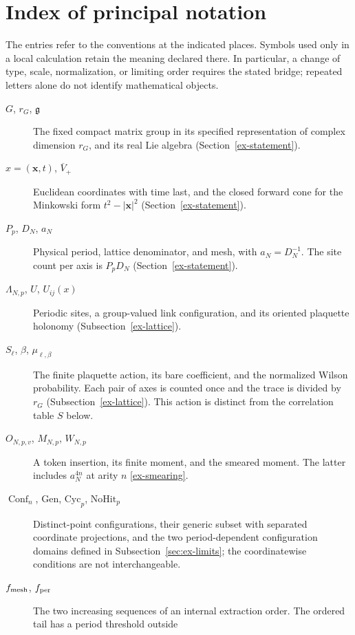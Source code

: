 \clearpage
\section{Index of principal notation}\label{sec:symbolic-index}

The entries refer to the conventions at the indicated places. Symbols used
only in a local calculation retain the meaning declared there. In particular,
a change of type, scale, normalization, or limiting order requires the stated
bridge; repeated letters alone do not identify mathematical objects.

\begin{description}
\item[$G$, $r_G$, $\mathfrak g$] The fixed compact matrix group in its
specified representation of complex dimension $r_G$, and its real Lie
algebra (Section~\ref{ex-statement}).
\item[$x=(\boldsymbol x,t)$, $\overline V_+$] Euclidean coordinates with
time last, and the closed forward cone for the Minkowski form
$t^2-|\boldsymbol x|^2$ (Section~\ref{ex-statement}).
\item[$P_p$, $D_N$, $a_N$] Physical period, lattice denominator, and mesh,
with $a_N=D_N^{-1}$. The site count per axis is $P_pD_N$
(Section~\ref{ex-statement}).
\item[$\Lambda_{N,p}$, $U$, $U_{ij}(x)$] Periodic sites, a group-valued
link configuration, and its oriented plaquette holonomy
(Subsection~\ref{ex-lattice}).
\item[$S_\ell$, $\beta$, $\mu_{\ell,\beta}$] The finite plaquette action,
its bare coefficient, and the normalized Wilson probability. Each pair
of axes is counted once and the trace is divided by $r_G$
(Subsection~\ref{ex-lattice}). This action is distinct from the correlation
table $S$ below.
\item[$O_{N,p,v}$, $M_{N,p}$, $W_{N,p}$] A token insertion, its finite
moment, and the smeared moment. The latter includes $a_N^{4n}$ at arity
$n$ \eqref{ex-smearing}.
\item[$\operatorname{Conf}_n$, $\mathrm{Gen}$, $\mathrm{Cyc}_p$,
$\mathrm{NoHit}_p$] Distinct-point configurations, their generic subset
with separated coordinate projections, and the two period-dependent
configuration domains defined in Subsection~\ref{sec:ex-limits}; the
coordinatewise conditions are not interchangeable.
\item[$f_{\rm mesh}$, $f_{\rm per}$] The two increasing sequences of an
internal extraction order. The ordered tail has a period threshold outside

\end{description}
